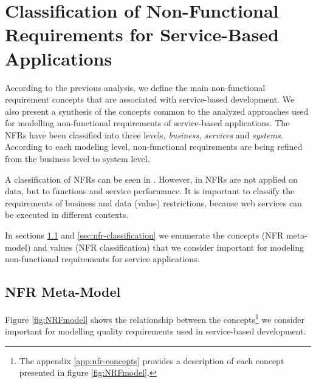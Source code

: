 \section{Classification of Non-Functional Requirements for Service-Based
Applications}
\label{sec:classification}

 
According to the previous analysis, we define the main non-functional
requirement concepts that are associated with service-based development. We also
present a synthesis of the concepts common to the analyzed approaches used for
modelling non-functional requirements of service-based applications. The NFRs
have been classified into three levels, \textit{business, services} and
\textit{systems}. According to each modeling level, non-functional requirements
are being refined from the business level to system level.

 A classification of NFRs can be seen in \cite{Yeom2006}.
 However, in \cite{Yeom2006} NFRs are not applied on data, but to functions and
 service performance. It is important to classify the
 requirements of business and data (value) restrictions, because web
 services can be executed in different contexts.
  
 In sections \ref{sec:nfr-metamodel} and \ref{sec:nfr-classification} we
 enumerate the concepts (NFR meta-model) and values (NFR classification) that
 we consider important for modeling non-functional requirements for service
 applications.
 
 \subsection{NFR Meta-Model} 
\label{sec:nfr-metamodel}

Figure \ref{fig:NRFmodel} shows the relationship between the
concepts\footnote{The appendix \ref{app:nfr-concepts} provides a description of
each concept presented in figure \ref{fig:NRFmodel}.} we consider important for
modelling quality requirements used in service-based development.




